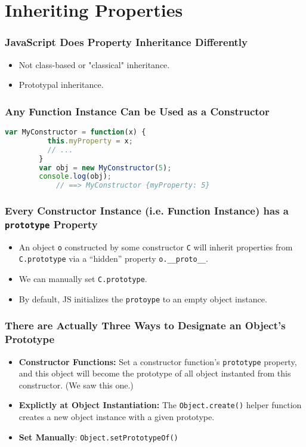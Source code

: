 \section{Inheriting Properties}

\begin{frame}
  \frametitle{JavaScript Does Property Inheritance Differently}
  \begin{itemize}
    \item Not class-based or "classical" inheritance.
    \item Prototypal inheritance.
  \end{itemize}
\end{frame}

\begin{frame}[fragile]
    \frametitle{Any Function Instance Can be Used as a Constructor}
    \begin{lstlisting}[language=JavaScript]
        var MyConstructor = function(x) {
          this.myProperty = x;
          // ...
        }
        var obj = new MyConstructor(5);
        console.log(obj);
            // ==> MyConstructor {myProperty: 5}
    \end{lstlisting}
\end{frame}

\begin{frame}
    \frametitle{Every Constructor Instance (i.e. Function Instance) has a
                \texttt{prototype} Property}
    \begin{itemize}
      \item{An object \texttt{o} constructed by some constructor \texttt{C} will
            inherit properties from \texttt{C.prototype} via a ``hidden''
            property \texttt{o.\_\_proto\_\_}.}
      \item{We can manually set \texttt{C.prototype}.}
      \item{By default, JS initializes the \texttt{protoype} to an empty object
            instance.}
    \end{itemize}
\end{frame}

\begin{frame}
    \frametitle{There are Actually Three Ways to Designate an Object's Prototype}
    \begin{itemize}
        \item{\textbf{Constructor Functions:} Set a constructor function's
              \texttt{prototype} property, and this object will become the
              prototype of all object instanted from this constructor. (We saw
              this one.)}
        \item{\textbf{Explictly at Object Instantiation:} The
              \texttt{Object.create()} helper function creates a new object
              instance with a given prototype.}
        \item{\textbf{Set Manually}}: \texttt{Object.setPrototypeOf()}
    \end{itemize}
\end{frame}

